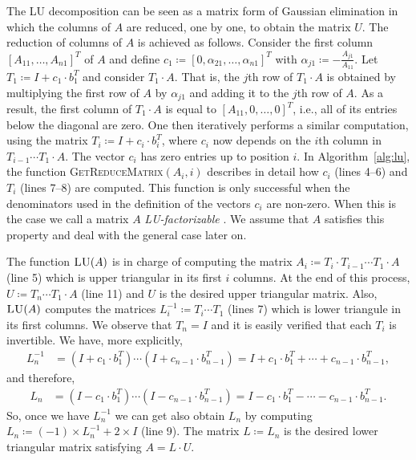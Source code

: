 The LU decomposition  can be seen as a matrix form of Gaussian elimination in which the columns of $A$
are reduced, one by one, to obtain the matrix $U$. The reduction of columns of $A$ is achieved
as follows. Consider the first column $[A_{11},\ldots,A_{n1}]^T$ of $A$ and  define 
$c_1 \coloneqq   [0, \alpha_{21},\ldots, \alpha_{n1}]^T$ 
with $\alpha_{j1} \coloneqq   -\frac{A_{j1}}{A_{11}}$. Let $T_1\coloneqq  I+ c_1\cdot b_1^T$ and consider
$T_1\cdot A$. That is, the $j$th row of $T_1\cdot A$ is obtained by multiplying the first row of $A$ by $\alpha_{j1}$ and adding it to the $j$th row of $A$. As a result, the first column of $T_1\cdot A$ is equal to $[A_{11},0,\ldots,0]^T$, i.e., 
all of its entries below the diagonal are zero.  One then iteratively performs a similar computation, using the matrix $T_i\coloneqq  I+c_i\cdot b_i^T$, where $c_i$ now depends on the $i$th column in $T_{i-1}\cdots T_1\cdot A$. 
The vector $c_i$ has zero entries up to position $i$. In 
Algorithm~\ref{alg:lu}, the function \textsc{GetReduceMatrix}$(A_i,i)$ describes in detail how $c_i$  (lines 4--6) and $T_i$ (lines 7--8) are computed.  This function is only successful when the denominators used in the definition of the vectors $c_i$ are non-zero. When this is the case we call a matrix $A$ \textit{LU-factorizable} \cite{num}. We assume that $A$ satisfies this property and deal with the general case later on.


The function $\textsc{LU}(A)$ is in charge of computing the matrix $A_i\coloneqq T_i\cdot T_{i-1}\cdots T_1\cdot A$ (line 5) which is upper triangular in its first $i$ columns. At the end of this process, $U\coloneqq T_n\cdots T_1\cdot A$ (line 11) and $U$ is the desired upper triangular matrix.
Also, $\textsc{LU}(A)$ computes the matrices $L_i^{-1}\coloneqq T_i\cdots T_1$ (lines 7) which is lower triangule in its first columns. We observe that $T_n=I$ and 
it is easily verified that each $T_i$ is invertible. We have, more explicitly,
    \begin{align*}
    L^{-1}_n&=(I+c_1\cdot b_1^T)\cdots (I+c_{n-1}\cdot  b_{n-1}^T)
    =I+c_1\cdot b_1^T+\cdots +c_{n-1}\cdot b_{n-1}^T,
    \end{align*}
and therefore,    
    \begin{align*}
    L_n&=(I-c_1\cdot b_1^T)\cdots (I-c_{n-1}\cdot b_{n-1}^T) =I-c_1\cdot b_1^T-\cdots - c_{n-1}\cdot b_{n-1}^T.
    \end{align*}
So, once we have $L_n^{-1}$ we can get	also obtain $L_n$ by computing
$L_n\coloneqq (-1)\times L_n^{-1} + 2\times I$ (line 9). The matrix $L\coloneqq L_n$ is the desired
lower triangular matrix satisfying $A=L\cdot U$.

